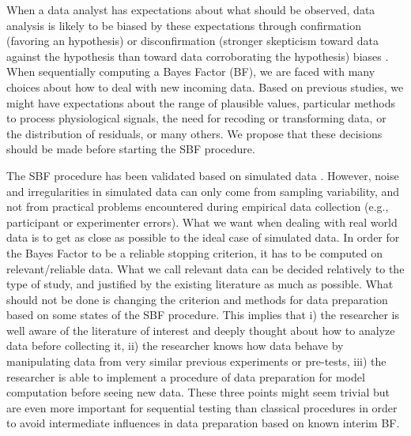 \documentclass[a4paper,man,natbib,floatsintext,donotrepeattitle]{apa6}
\begin{document}
When a data analyst has expectations about what should be observed, data analysis is likely to be biased by these expectations through confirmation (favoring an hypothesis) or disconfirmation (stronger skepticism toward data against the hypothesis than toward data corroborating the hypothesis) biases \citep{lilienfeld_blind_2017}.
When sequentially computing a Bayes Factor (BF), we are faced with many choices about how to deal with new incoming data. Based on previous studies, we might have expectations about the range of plausible values, particular methods to process physiological signals, the need for recoding or transforming data, or the distribution of residuals, or many others. We propose that these decisions should be made before starting the SBF procedure.

The SBF procedure has been validated based on simulated data \citep{schonbrodt_sequential_2017}. However, noise and irregularities in simulated data can only come from sampling variability, and not from practical problems encountered during empirical data collection (e.g., participant or experimenter errors). What we want when dealing with real world data is to get as close as possible to the ideal case of simulated data. In order for the Bayes Factor to be a reliable stopping criterion, it has to be computed on relevant/reliable data. What we call relevant data can be decided relatively to the type of study, and justified by the existing literature as much as possible. What should not be done is changing the criterion and methods for data preparation based on some states of the SBF procedure. This implies that i) the researcher is well aware of the literature of interest and deeply thought about how to analyze data before collecting it, ii) the researcher knows how data behave by manipulating data from very similar previous experiments or pre-tests, iii) the researcher is able to implement a procedure of data preparation for model computation before seeing new data. These three points might seem trivial but are even more important for sequential testing than classical procedures in order to avoid intermediate influences in data preparation based on known interim BF.
\end{document}
